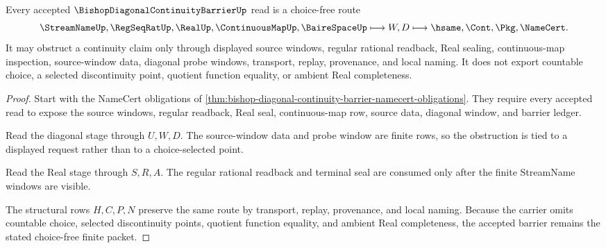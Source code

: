 \begin{theorem}
\label{thm:bishop-diagonal-continuity-barrier-choice-free-route}
Every accepted $\BishopDiagonalContinuityBarrierUp$ read is a choice-free route
$$
\StreamNameUp,\RegSeqRatUp,\RealUp,\ContinuousMapUp,\BaireSpaceUp \longmapsto W,D \longmapsto \hsame,\Cont,\Pkg,\NameCert .
$$
It may obstruct a continuity claim only through displayed source windows, regular rational readback, Real sealing, continuous-map inspection, source-window data, diagonal probe windows, transport, replay, provenance, and local naming. It does not export countable choice, a selected discontinuity point, quotient function equality, or ambient Real completeness.
\end{theorem}
\begin{proof}
Start with the NameCert obligations of \autoref{thm:bishop-diagonal-continuity-barrier-namecert-obligations}. They require every accepted read to expose the source windows, regular readback, Real seal, continuous-map row, source data, diagonal window, and barrier ledger.

Read the diagonal stage through $U,W,D$. The source-window data and probe window are finite rows, so the obstruction is tied to a displayed request rather than to a choice-selected point.

Read the Real stage through $S,R,A$. The regular rational readback and terminal seal are consumed only after the finite StreamName windows are visible.

The structural rows $H,C,P,N$ preserve the same route by transport, replay, provenance, and local naming. Because the carrier omits countable choice, selected discontinuity points, quotient function equality, and ambient Real completeness, the accepted barrier remains the stated choice-free finite packet.
\end{proof}



